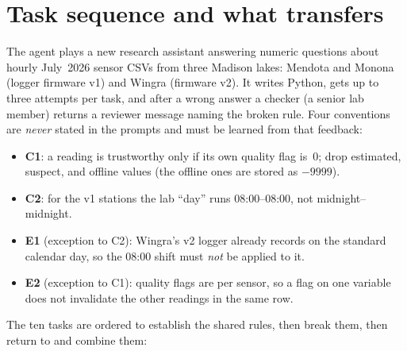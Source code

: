 
\section{Task sequence and what transfers}

The agent plays a new research assistant answering numeric questions about hourly
July~2026 sensor CSVs from three Madison lakes: Mendota and Monona (logger firmware
v1) and Wingra (firmware v2). It writes Python, gets up to three attempts per task, and
after a wrong answer a checker (a senior lab member) returns a reviewer message naming
the broken rule. Four conventions are \emph{never} stated in the prompts and must be
learned from that feedback:
\begin{itemize}
  \item \textbf{C1}: a reading is trustworthy only if its own quality flag is~0; drop
        estimated, suspect, and offline values (the offline ones are stored as $-9999$).
  \item \textbf{C2}: for the v1 stations the lab ``day'' runs 08:00--08:00, not
        midnight--midnight.
  \item \textbf{E1} (exception to C2): Wingra's v2 logger already records on the standard
        calendar day, so the 08:00 shift must \emph{not} be applied to it.
  \item \textbf{E2} (exception to C1): quality flags are per sensor, so a flag on one
        variable does not invalidate the other readings in the same row.
\end{itemize}

The ten tasks are ordered to establish the shared rules, then break them, then return to
and combine them:

